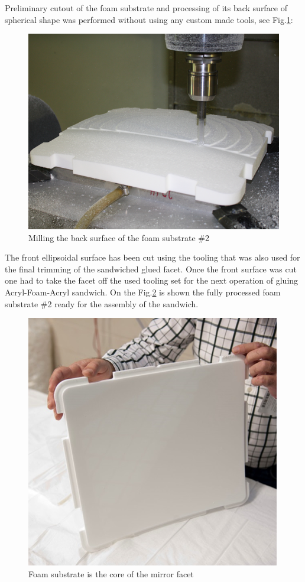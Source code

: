 \indent Preliminary cutout of the foam substrate and processing of its back surface of spherical shape was performed without using any custom made tools, see Fig.\ref{fig:Cut_Substr}:
\begin{figure}[h]
    \centering
    \includegraphics[width=0.9\linewidth]{Cut_Substr.png}
    \caption{Milling the back surface of the foam substrate \#2}
    \label{fig:Cut_Substr}
\end{figure}{}
The front ellipsoidal surface has been cut using the tooling that was also used for the final trimming of the sandwiched glued facet. Once the front surface was cut one had to take the facet off the used tooling set for the next operation of gluing Acryl-Foam-Acryl sandwich. On the Fig.\ref{fig:Foam_Sub} is shown the fully processed foam substrate \#2 ready for the assembly of the sandwich. 
\begin{figure}[h]
    \centering
    \includegraphics[width=0.9\linewidth]{Foam_Sub.png}
    \caption{Foam substrate is the core of the mirror facet}
    \label{fig:Foam_Sub}
\end{figure}{}
